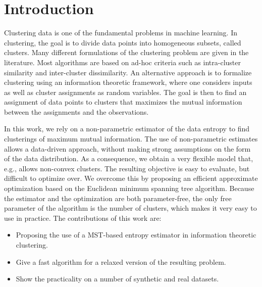 
\section{Introduction}
Clustering data is one of the fundamental problems in machine learning.  In
clustering, the goal is to divide data points into homogeneous subsets, called
clusters.
Many different formulations of the clustering problem are given in the literature.
Most algorithms are based on ad-hoc criteria such as intra-cluster similarity
and inter-cluster dissimilarity.
%
An alternative approach is to formalize clustering using an information
theoretic framework, where one considers inputs as well as cluster assignments
as random variables.  The goal is then to find an assignment of data points to
clusters that maximizes the mutual information between the assignments and the
observations.

In this work, we rely on a non-parametric estimator of the data entropy to find 
clusterings of maximum mutual information.
%
The use of non-parametric estimates allows a data-driven approach, without 
making strong assumptions on the form of the data distribution.
%
As a consequence, we obtain a very flexible model that, e.g{.}, allows 
non-convex clusters.
%
The resulting objective is easy to evaluate, but difficult to optimize
over. We overcome this by proposing an efficient approximate optimization
based on the Euclidean minimum spanning tree algorithm. 
%
Because the estimator and the optimization are both parameter-free, 
the only free parameter of the algorithm is the number of clusters, 
which makes it very easy to use in practice.
%
The contributions of this work are:
\begin{itemize}
    \item Proposing the use of a MST-based entropy estimator in information theoretic clustering.
    \item Give a fast algorithm for a relaxed version of the resulting problem.
    \item Show the practicality on a number of synthetic and real datasets.
\end{itemize}

%


